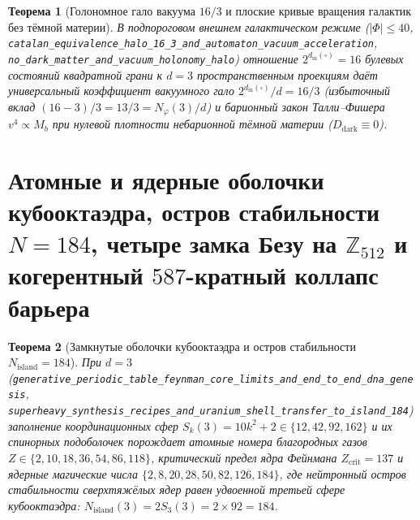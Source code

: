 \documentclass[11pt,a4paper]{article}
\theoremstyle{plain}
\newtheorem{theorem}{Теорема}[section]
\theoremstyle{definition}
\begin{document}
\begin{theorem}[Голономное гало вакуума $16/3$ и плоские кривые вращения галактик без тёмной материи]
\label{thm:gravity-halo}
В подпороговом внешнем галактическом режиме ($|\Phi|\le 40$, \texttt{catalan\_equivalence\_halo\_16\_3\_and\_automaton\_vacuum\_acceleration}, \texttt{no\_dark\_matter\_and\_vacuum\_holonomy\_halo}) отношение $2^{d_{\mathrm{in}}(\square)} = 16$ булевых состояний квадратной грани к $d=3$ пространственным проекциям даёт универсальный коэффициент вакуумного гало $2^{d_{\mathrm{in}}(\square)}/d = 16/3$ (избыточный вклад $(16-3)/3 = 13/3 = N_\varphi(3)/d$) и барионный закон Талли--Фишера $v^4\propto M_b$ при нулевой плотности небарионной тёмной материи ($D_{\mathrm{dark}}\equiv 0$).
\end{theorem}

\section{Атомные и ядерные оболочки кубооктаэдра, остров стабильности \texorpdfstring{$N=184$}{N=184}, четыре замка Безу на \texorpdfstring{$\mathbb{Z}_{512}$}{Z512} и когерентный \texorpdfstring{$587$}{587}-кратный коллапс барьера}
\label{sec:nuclear-587}

\begin{theorem}[Замкнутые оболочки кубооктаэдра и остров стабильности $N_{\mathrm{island}}=184$]
\label{thm:nuclear-shells-184}
При $d=3$ (\texttt{generative\_periodic\_table\_feynman\_core\_limits\_and\_end\_to\_end\_dna\_genesis}, \texttt{superheavy\_synthesis\_recipes\_and\_uranium\_shell\_transfer\_to\_island\_184}) заполнение координационных сфер $S_k(3) = 10k^2 + 2 \in \{12,42,92,162\}$ и их спинорных подоболочек порождает атомные номера благородных газов $Z\in\{2,10,18,36,54,86,118\}$, критический предел ядра Фейнмана $Z_{\mathrm{crit}} = 137$ и ядерные магические числа $\{2,8,20,28,50,82,126,184\}$, где нейтронный остров стабильности сверхтяжёлых ядер равен удвоенной третьей сфере кубооктаэдра: $N_{\mathrm{island}}(3) = 2S_3(3) = 2\times 92 = 184$.
\end{theorem}
\end{document}
